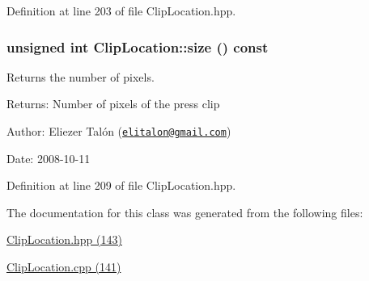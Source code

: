 Definition at line 203 of file ClipLocation.hpp.\hypertarget{class_clip_location_2d01b03e23d610b26bbb2e18278cf5a8}{
\subsubsection[size]{\setlength{\rightskip}{0pt plus 5cm}unsigned int ClipLocation::size () const}}
\label{class_clip_location_2d01b03e23d610b26bbb2e18278cf5a8}


Returns the number of pixels. 

\begin{Desc}
\item[Returns:]Number of pixels of the press clip\end{Desc}
\begin{Desc}
\item[Author:]Eliezer Talón (\href{mailto:elitalon@gmail.com}{\tt elitalon@gmail.com}) \end{Desc}
\begin{Desc}
\item[Date:]2008-10-11 \end{Desc}


Definition at line 209 of file ClipLocation.hpp.

The documentation for this class was generated from the following files:\begin{CompactItemize}
\item 
\hyperlink{_clip_location_8hpp}{ClipLocation.hpp (143)}\item 
\hyperlink{_clip_location_8cpp}{ClipLocation.cpp (141)}\end{CompactItemize}

